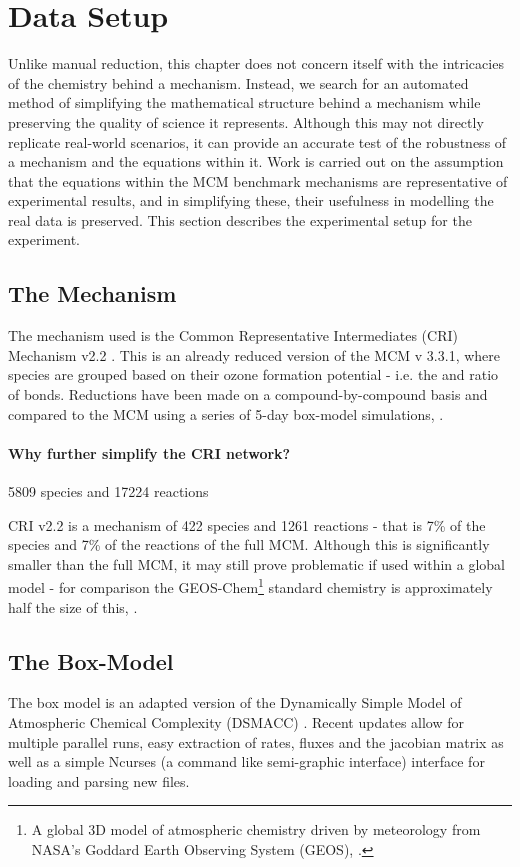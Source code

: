 \section{Data Setup}
Unlike manual reduction, this chapter does not concern itself with the intricacies of the chemistry behind a mechanism. Instead, we search for an automated method of simplifying the mathematical structure behind a mechanism while preserving the quality of science it represents. Although this may not directly replicate real-world scenarios, it can provide an accurate test of the robustness of a mechanism and the equations within it.
Work is carried out on the assumption that the equations within the MCM benchmark mechanisms are representative of experimental results, and in simplifying these, their usefulness in modelling the real data is preserved. This section describes the experimental setup for the experiment.


\subsection{The Mechanism}


The mechanism used is the Common Representative Intermediates (CRI) Mechanism v2.2 \citep{criv2}. This is an already reduced version of the MCM v 3.3.1, where species are grouped based on their ozone formation potential - i.e. the  and  ratio of bonds.
Reductions have been made on a compound-by-compound basis and compared to the MCM using a series of 5-day box-model simulations, \citep{cri}.

\paragraph*{Why further simplify the CRI network?}\label{sec:whycri}
5809 species and 17224 reactions

CRI v2.2 \citep{cri} is a mechanism of 422 species and 1261 reactions - that is 7\% of the species and 7\% of the reactions of the full MCM. Although this is significantly smaller than the full MCM, it may still prove problematic if used within a global model - for comparison the GEOS-Chem\footnote{A global 3D model of atmospheric chemistry driven by meteorology from NASA's Goddard Earth Observing System (GEOS), \citep{geos}.} standard chemistry is approximately half the size of this, \citep{geosgit}.

\subsection{The Box-Model}
The box model is an adapted version of the Dynamically Simple Model of Atmospheric Chemical Complexity (DSMACC) \citep{dsmacc,dsmaccgit}. Recent updates allow for multiple parallel runs, easy extraction of rates, fluxes and the jacobian matrix as well as a simple Ncurses (a command like semi-graphic interface) interface for loading and parsing new files.

